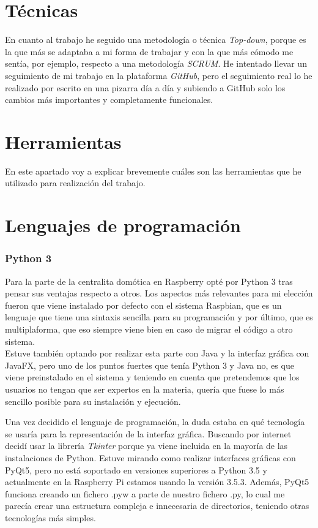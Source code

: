 
\section {Técnicas}

En cuanto al trabajo he seguido una metodología o técnica \textit{Top-down}, porque es la que más se adaptaba a mi forma de trabajar y con la que más cómodo me sentía, por ejemplo, respecto a una metodología \textit{SCRUM}.
He intentado llevar un seguimiento de mi trabajo en la plataforma \textit{GitHub}, pero el seguimiento real lo he realizado por escrito en una pizarra día a día y subiendo a GitHub solo los cambios más importantes y completamente funcionales.

\section {Herramientas}
En este apartado voy a explicar brevemente cuáles son las herramientas que he utilizado para realización del trabajo.

\section{Lenguajes de programación}

\subsubsection{Python 3}

Para la parte de la centralita domótica en Raspberry opté por Python 3 tras pensar sus ventajas respecto a otros. Los aspectos más relevantes para mi elección fueron que viene instalado por defecto con el sistema Raspbian, que es un lenguaje que tiene una sintaxis sencilla para su programación y por último, que es multiplaforma, que eso siempre viene bien en caso de migrar el código a otro sistema.\\
Estuve también optando por realizar esta parte con Java y la interfaz gráfica con JavaFX, pero uno de los puntos fuertes que tenía Python 3 y Java no, es que viene preinstalado en el sistema y teniendo en cuenta que pretendemos que los usuarios no tengan que ser expertos en la materia, quería que fuese lo más sencillo posible para su instalación y ejecución.

Una vez decidido el lenguaje de programación, la duda estaba en qué tecnología se usaría para la representación de la interfaz gráfica. Buscando por internet decidí usar la librería \textit{Tkinter} porque ya viene incluida en la mayoría de las instalaciones de Python. Estuve mirando como realizar interfaces gráficas con PyQt5, pero no está soportado en versiones superiores a Python 3.5 y actualmente en la Raspberry Pi estamos usando la versión 3.5.3. Además, PyQt5 funciona creando un fichero .pyw a parte de nuestro fichero .py, lo cual me parecía crear una estructura compleja e innecesaria de directorios, teniendo otras tecnologías más simples.

